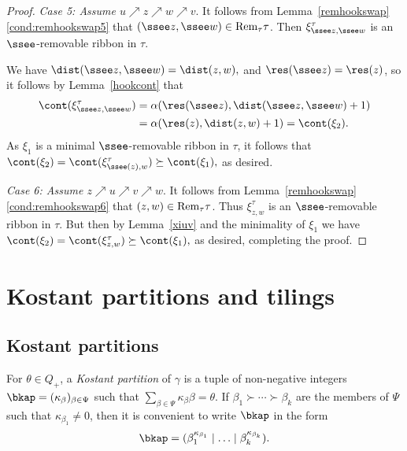 \begin{proof}
{\em Case 5: Assume \(u \nearrow z \nearrow w \nearrow v\)}. It follows from Lemma~\ref{remhookswap}\eqref{cond:remhookswap5} that \((\ssee z, \ssee w) \in \textup{Rem}_\tau\tau\). Then \(\xi^\tau_{\ssee z, \ssee w}\) is an \(\ssee\)-removable ribbon in \(\tau\). 

We have
\(
 \dist(\ssee z,\ssee w) = \dist (z,w),
\)
 and
\(
 \res(\ssee z) = \res(z)
\), so it follows by Lemma~\ref{hookcont} that 
 \begin{align*}
 \cont(\xi^\tau_{\ssee z,\ssee w}) &= \alpha(\res(\ssee z), \dist(\ssee z,\ssee w)+1)\\
 &= \alpha(\res(z),\dist(z,w)+1) = \cont(\xi_2).
 \end{align*}
As \(\xi_1\) is a minimal \(\ssee\)-removable ribbon in \(\tau\), it follows that
\(
\cont(\xi_2) = \cont(\xi^\tau_{\ssee(z),w}) \succeq \cont(\xi_1),
\)
as desired.

{\em Case 6: Assume \(z \nearrow u \nearrow v \nearrow w\)}.  It follows from Lemma~\ref{remhookswap}\eqref{cond:remhookswap6} that \((z, w) \in \textup{Rem}_\tau\tau\). Thus \(\xi^\tau_{z,w}\) is an \(\ssee\)-removable ribbon in \(\tau\). 
But then by Lemma~\ref{xiuv} and the minimality of \(\xi_1\) we have
\(
\cont(\xi_2) =\cont(\xi^\tau_{z,w}) \succeq \cont(\xi_1),
\)
as desired, completing the proof. 
\end{proof}

\section{Kostant partitions and tilings}\label{Kostsec}



\subsection{Kostant partitions}
For \(\theta \in Q_+\), a {\em Kostant partition} of \(\gamma\) is a tuple of non-negative integers \(\bkap = (\kappa_\beta)_{\beta \in \Psi}\) such that \(\sum_{\beta \in \Psi} \kappa_\beta \beta = \theta\). If \(\beta_1 \succ \cdots \succ \beta_k\) are the members of \(\Psi\) such that \(\kappa_{\beta_1} \neq 0\), then it is convenient to write \(\bkap\) in the form
\begin{align*}
\bkap = 
(\beta_1^{\kappa_{\beta_1}} \mid \ldots \mid \beta_k^{\kappa_{\beta_k}}).
\end{align*}

